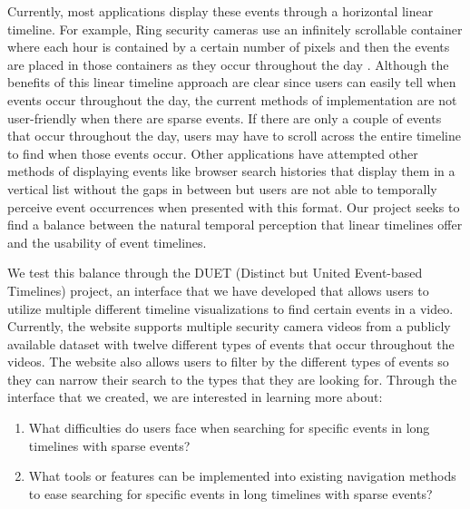 \documentclass[doublespace,draft,nopageskip]{VTthesis} %
\begin{document}
Currently, most applications display these events through a horizontal linear timeline. For example, Ring security cameras use an infinitely scrollable container where each hour is contained by a certain number of pixels and then the events are placed in those containers as they occur throughout the day \cite{kellyRingVideoDoorbell2023}. Although the benefits of this linear timeline approach are clear since users can easily tell when events occur throughout the day, the current methods of implementation are not user-friendly when there are sparse events. If there are only a couple of events that occur throughout the day, users may have to scroll across the entire timeline to find when those events occur. Other applications have attempted other methods of displaying events like browser search histories that display them in a vertical list without the gaps in between but users are not able to temporally perceive event occurrences when presented with this format. Our project seeks to find a balance between the natural temporal perception that linear timelines offer and the usability of event timelines.

We test this balance through the DUET (Distinct but United Event-based Timelines) project, an interface that we have developed that allows users to utilize multiple different timeline visualizations to find certain events in a video. Currently, the website supports multiple security camera videos from a publicly available dataset with twelve different types of events that occur throughout the videos. The website also allows users to filter by the different types of events so they can narrow their search to the types that they are looking for. Through the interface that we created, we are interested in learning more about: 

\begin{enumerate}
    \item What difficulties do users face when searching for specific events in long timelines with sparse events? 
    \item What tools or features can be implemented into existing navigation methods to ease searching for specific events in long timelines with sparse events? 
\end{enumerate}
\end{document}
